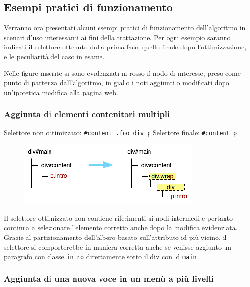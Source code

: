 \subsection {Esempi pratici di funzionamento}

Verranno ora presentati alcuni esempi pratici di funzionamento dell'algoritmo in scenari d'uso interessanti ai fini della trattazione. Per ogni esempio saranno indicati il selettore ottenuto dalla prima fase, quello finale dopo l'ottimizzazione, e le peculiarità del caso in esame.

Nelle figure inserite si sono evidenziati in rosso il nodo di interesse, preso come punto di partenza dall'algoritmo, in giallo i noti aggiunti o modificati dopo un'ipotetica modifica alla pagina web.

\subsubsection {Aggiunta di elementi contenitori multipli}

Selettore non ottimizzato:  \verb|#content .foo div p| 
\newline
Selettore finale:  \verb|#content p| 

\begin{figure}[htbp]
\begin{center}
\includegraphics{images/dom_examples/wrap.png}
\end{center}
\end{figure}

Il selettore ottimizzato non contiene riferimenti ai nodi intermedi e pertanto continua a selezionare l'elemento corretto anche dopo la modifica evidenziata. Grazie al partizionamento dell'albero basato sull'attributo id più vicino, il selettore si comporterebbe in maniera corretta anche se venisse aggiunto un paragrafo con classe \verb|intro| direttamente sotto il div con id \verb|main|

\subsubsection {Aggiunta di una nuova voce in un menù a più livelli}

